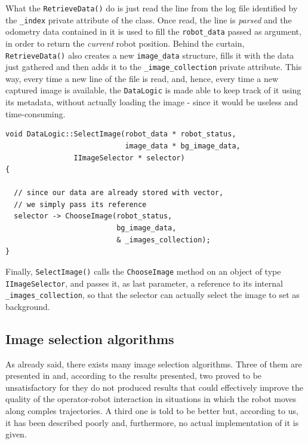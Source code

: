 %
What the \texttt{RetrieveData()} do is just read the line from the log 
file identified by the \texttt{\_index} private attribute of the class.
Once read, the line is \textit{parsed} and the odometry data contained 
in it is used to fill the \texttt{robot\_data} passed as argument, in 
order to return the \textit{current} robot position.
%
Behind the curtain, \texttt{RetrieveData()} also creates a new 
\texttt{image\_data} structure, fills it with the data just 
gathered and then adds it to the \texttt{\_image\_collection} 
private attribute.
%
This way, every time a new line of the file is read, and, hence, 
every time a new captured image is available, the \texttt{DataLogic} 
is made able to keep track of it using its metadata, without actually 
loading the image - since it would be useless and time-consuming.
%
\begin{lstlisting}[caption={\texttt{DataLogic::SelectImage()} method}, label={code:selectimage_method}, frame=trBL]
void DataLogic::SelectImage(robot_data * robot_status,
                            image_data * bg_image_data,
			    IImageSelector * selector)
{

  // since our data are already stored with vector,
  // we simply pass its reference
  selector -> ChooseImage(robot_status, 
                          bg_image_data, 
                          & _images_collection);
}
\end{lstlisting}
%
Finally, \texttt{SelectImage()} calls the \texttt{ChooseImage} method 
on an object of type \texttt{IImageSelector}, and passes it, as last 
parameter, a reference to its internal \texttt{\_images\_collection}, 
so that the selector can actually select the image to set as 
background.
%
%
%
\subsection{Image selection algorithms}
\label{sub:metrics}
As already said, there exists many image selection algorithms. 
Three of them are presented in \cite{sugimoto} and, according 
to the results presented, two proved to be unsatisfactory for 
they do not produced results that could effectively improve 
the quality of the operator-robot interaction in situations 
in which the robot moves along comples trajectories.
%
A third one is told to be better but, according to us, it has 
been described poorly and, furthermore, no actual implementation 
of it is given.
%

